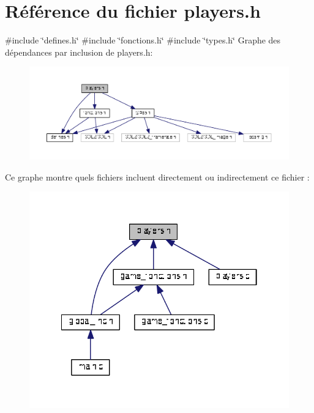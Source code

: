 \section{Référence du fichier players.\+h}
\label{players_8h}
{\ttfamily \#include \char`\"{}defines.\+h\char`\"{}}\newline
{\ttfamily \#include \char`\"{}fonctions.\+h\char`\"{}}\newline
{\ttfamily \#include \char`\"{}types.\+h\char`\"{}}\newline
Graphe des dépendances par inclusion de players.\+h\+:
\nopagebreak
\begin{figure}[H]
\begin{center}
\leavevmode
\includegraphics[width=350pt]{players_8h__incl}
\end{center}
\end{figure}
Ce graphe montre quels fichiers incluent directement ou indirectement ce fichier \+:
\nopagebreak
\begin{figure}[H]
\begin{center}
\leavevmode
\includegraphics[width=322pt]{players_8h__dep__incl}
\end{center}
\end{figure}
